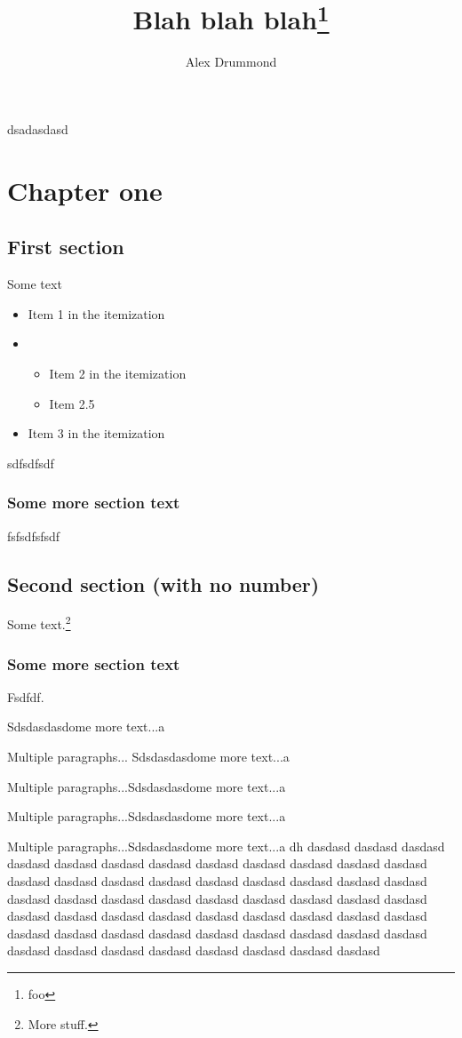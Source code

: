 \documentclass[doublespace,endnotes]{lingpaper}
\author{Alex Drummond}
\title{Blah blah blah\thanks{foo}}
\begin{document}
\maketitle

\noindent
dsadasdasd

\chapter{Chapter one}

\section{First section}
Some text

\begin{itemize}
\setlength\topsep{50pt}%
\setlength\partopsep{50pt}%
\setlength\itemsep{0pt}
\item
Item 1 in the itemization
\item
\begin{itemize}
\item
Item 2 in the itemization
\item
Item 2.5
\end{itemize}
\item
Item 3 in the itemization
\end{itemize}

sdfsdfsdf

\subsection{Some more section text}
fsfsdfsfsdf

\section*{Second section (with no number)}
Some text.\footnote{More stuff.}

\subsection{Some more section text}
Fsdfdf.

Sdsdasdasdome more text...a

Multiple paragraphs...
Sdsdasdasdome more text...a

Multiple paragraphs...Sdsdasdasdome more text...a

Multiple paragraphs...Sdsdasdasdome more text...a

Multiple paragraphs...Sdsdasdasdome more text...a dh dasdasd dasdasd dasdasd dasdasd dasdasd dasdasd dasdasd dasdasd dasdasd dasdasd dasdasd dasdasd dasdasd dasdasd dasdasd dasdasd dasdasd dasdasd dasdasd dasdasd dasdasd dasdasd dasdasd dasdasd dasdasd dasdasd dasdasd dasdasd dasdasd dasdasd dasdasd dasdasd dasdasd dasdasd dasdasd dasdasd dasdasd dasdasd dasdasd dasdasd dasdasd dasdasd dasdasd dasdasd dasdasd dasdasd dasdasd dasdasd dasdasd dasdasd dasdasd dasdasd dasdasd dasdasd dasdasd dasdasd 
\end{document}
